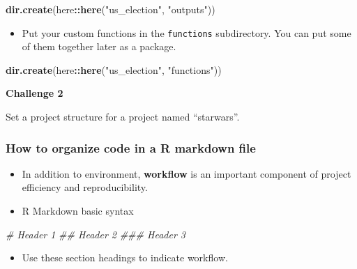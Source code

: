 \documentclass[
]{book}
\newenvironment{Shaded}{\begin{snugshade}}{\end{snugshade}}
\newcommand{\CommentTok}[1]{\textcolor[rgb]{0.56,0.35,0.01}{\textit{#1}}}
\newcommand{\KeywordTok}[1]{\textcolor[rgb]{0.13,0.29,0.53}{\textbf{#1}}}
\newcommand{\NormalTok}[1]{#1}
\newcommand{\OperatorTok}[1]{\textcolor[rgb]{0.81,0.36,0.00}{\textbf{#1}}}
\newcommand{\StringTok}[1]{\textcolor[rgb]{0.31,0.60,0.02}{#1}}
\providecommand{\tightlist}{%
  \setlength{\itemsep}{0pt}\setlength{\parskip}{0pt}}
\begin{document}
\begin{Shaded}
\begin{Highlighting}[]
\KeywordTok{dir.create}\NormalTok{(here}\OperatorTok{::}\KeywordTok{here}\NormalTok{(}\StringTok{"us\_election"}\NormalTok{, }\StringTok{"outputs"}\NormalTok{))}
\end{Highlighting}
\end{Shaded}

\begin{itemize}
\tightlist
\item
  Put your custom functions in the \texttt{functions} subdirectory. You can put some of them together later as a package.
\end{itemize}

\begin{Shaded}
\begin{Highlighting}[]
\KeywordTok{dir.create}\NormalTok{(here}\OperatorTok{::}\KeywordTok{here}\NormalTok{(}\StringTok{"us\_election"}\NormalTok{, }\StringTok{"functions"}\NormalTok{))}
\end{Highlighting}
\end{Shaded}

\textbf{Challenge 2}

Set a project structure for a project named ``starwars''.

\hypertarget{how-to-organize-code-in-a-r-markdown-file}{%
\subsubsection{How to organize code in a R markdown file}\label{how-to-organize-code-in-a-r-markdown-file}}

\begin{itemize}
\item
  In addition to environment, \textbf{workflow} is an important component of project efficiency and reproducibility.
\item
  R Markdown basic syntax
\end{itemize}

\begin{Shaded}
\begin{Highlighting}[]
\CommentTok{\# Header 1}
\CommentTok{\#\# Header 2}
\CommentTok{\#\#\# Header 3}
\end{Highlighting}
\end{Shaded}

\begin{itemize}
\tightlist
\item
  Use these section headings to indicate workflow.
\end{itemize}
\end{document}
